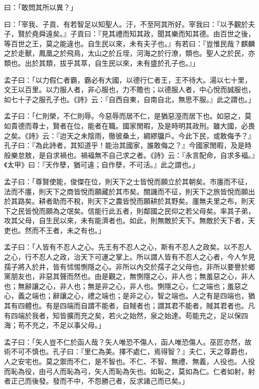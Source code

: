 \documentclass[12pt,a4paper]{ctexbook}
\begin{document}
曰：「敢問其所以異？」\par
曰：「宰我、子貢、有若智足以知聖人。汙，不至阿其所好。宰我曰：『以予觀於夫子，賢於堯舜遠矣。』子貢曰：『見其禮而知其政，聞其樂而知其德。由百世之後，等百世之王，莫之能違也。自生民以來，未有夫子也。』有若曰：『豈惟民哉？麒麟之於走獸，鳳凰之於飛鳥，太山之於丘垤，河海之於行潦，類也。聖人之於民，亦類也。出於其類，拔乎其萃，自生民以來，未有盛於孔子也。』」\par
孟子曰：「以力假仁者霸，霸必有大國，以德行仁者王，王不待大。湯以七十里，文王以百里。以力服人者，非心服也，力不贍也；以德服人者，中心悅而誠服也，如七十子之服孔子也。《詩》云：『自西自東，自南自北，無思不服。』此之謂也。」\par
孟子曰：「仁則榮，不仁則辱。今惡辱而居不仁，是猶惡溼而居下也。如惡之，莫如貴德而尊士，賢者在位，能者在職。國家閒暇，及是時明其政刑。雖大國，必畏之矣。《詩》云：『迨天之未陰雨，徹彼桑土，綢繆牖戶。今此下民，或敢侮予？』孔子曰：『為此詩者，其知道乎！能治其國家，誰敢侮之？』今國家閒暇，及是時般樂怠敖，是自求禍也。禍褔無不自己求之者。《詩》云：『永言配命，自求多褔。』《太甲》曰：『天作孽，猶可違；自作孽，不可活。』此之謂也。」\par
孟子曰：「尊賢使能，俊傑在位，則天下之士皆悅而願立於其朝矣。市廛而不征，法而不廛，則天下之商皆悅而願藏於其市矣。關譏而不征，則天下之旅皆悅而願出於其路矣。耕者助而不稅，則天下之農皆悅而願耕於其野矣。廛無夫里之布，則天下之民皆悅而願為之氓矣。信能行此五者，則鄰國之民仰之若父母矣。率其子弟，攻其父母，自生民以來，未有能濟者也。如此，則無敵於天下。無敵於天下者，天吏也。然而不王者，未之有也。」\par
孟子曰：「人皆有不忍人之心。先王有不忍人之心，斯有不忍人之政矣。以不忍人之心，行不忍人之政，治天下可運之掌上。所以謂人皆有不忍人之心者，今人乍見孺子將入於井，皆有怵惕惻隱之心。非所以內交於孺子之父母也，非所以要譽於鄉黨朋友也，非惡其聲而然也。由是觀之，無惻隱之心，非人也；無羞惡之心，非人也；無辭讓之心，非人也；無是非之心，非人也。惻隱之心，仁之端也；羞惡之心，義之端也；辭讓之心，禮之端也；是非之心，智之端也。人之有是四端也，猶其有四體也。有是四端而自謂不能者，自賊者也；謂其君不能者，賊其君者也。凡有四端於我者，知皆擴而充之矣，若火之始然，泉之始達。苟能充之，足以保四海；苟不充之，不足以事父母。」\par
孟子曰：「矢人豈不仁於函人哉？矢人唯恐不傷人，函人唯恐傷人。巫匠亦然，故術不可不慎也。孔子曰：『里仁為美。擇不處仁，焉得智？』夫仁，天之尊爵也，人之安宅也。莫之禦而不仁，是不智也。不仁、不智、無禮、無義，人役也。人役而恥為役，由弓人而恥為弓，矢人而恥為矢也。如恥之，莫如為仁。仁者如射，射者正己而後發。發而不中，不怨勝己者，反求諸己而已矣。」\par
\end{document}
